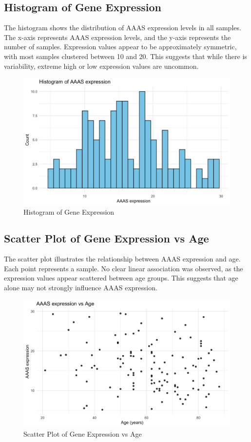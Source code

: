 \documentclass{article}
\begin{document}
\subsection{Histogram of Gene Expression}

The histogram shows the distribution of AAAS expression levels in all samples. The x-axis represents AAAS expression levels, and the y-axis represents the number of samples. Expression values appear to be approximately symmetric, with most samples clustered between 10 and 20. This suggests that while there is variability, extreme high or low expression values are uncommon.

\begin{figure}[H]
\centering
\includegraphics[width=0.80\linewidth]{Histogram of AAAS expression.png}
\caption{\label{fig:histogram}Histogram of Gene Expression}
\end{figure}

\subsection{Scatter Plot of Gene Expression vs Age}

The scatter plot illustrates the relationship between AAAS expression and age. Each point represents a sample. No clear linear association was observed, as the expression values appear scattered between age groups. This suggests that age alone may not strongly influence AAAS expression.

\begin{figure}[H]
\centering
\includegraphics[width=0.80\linewidth]{AAAS expression vs Age.png}
\caption{\label{fig:scatterplot}Scatter Plot of Gene Expression vs Age}
\end{figure}
\end{document}
